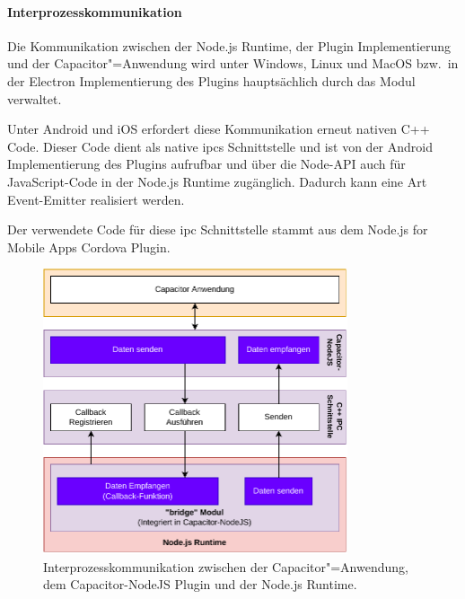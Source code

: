 \newpage

\paragraph{Interprozesskommunikation}

Die Kommunikation zwischen der Node.js Runtime, der Plugin Implementierung und der Capacitor"=Anwendung wird unter Windows, Linux und MacOS bzw.\ in der Electron Implementierung des Plugins hauptsächlich durch das  Modul verwaltet.
\cite{electron:docs}

Unter Android und iOS erfordert diese Kommunikation erneut nativen C++ Code.
Dieser Code dient als native \acp{ipc} Schnittstelle und ist von der Android Implementierung des Plugins aufrufbar und über die Node-API auch für JavaScript-Code in der Node.js Runtime zugänglich.
Dadurch kann eine Art Event-Emitter realisiert werden.
\cite{nodejs-mobile-cordova, nodejs}

Der verwendete Code für diese \ac{ipc} Schnittstelle stammt aus dem Node.js for Mobile Apps Cordova Plugin.
\cite{nodejs-mobile-cordova}

\vspace{1em}

\begin{figure}[H]
  \centering
  \includegraphics[width=0.8\textwidth]{assets/02_Capacitor-NodeJS/03_Interprozesskommunikation.drawio.pdf}
  \caption[Capacitor-NodeJS / Interprozesskommunikation]{Interprozesskommunikation zwischen der Capacitor"=Anwendung, dem Capacitor-NodeJS Plugin und der Node.js Runtime.}
\end{figure}

